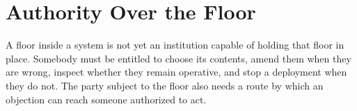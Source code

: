 \chapter{Authority Over the Floor}
\label{ch:authority}
A floor inside a system is not yet an institution capable of holding
that floor in place. Somebody must be entitled to choose its contents,
amend them when they are wrong, inspect whether they remain operative,
and stop a deployment when they do not. The party subject to the floor
also needs a route by which an objection can reach someone authorized to
act.
